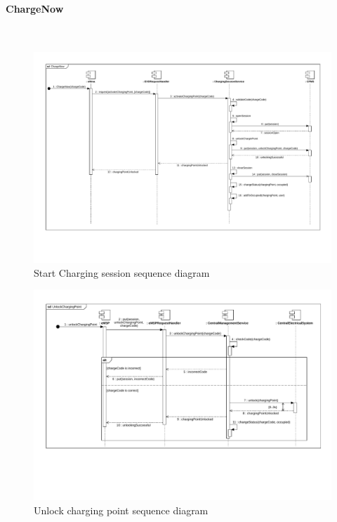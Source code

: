 \paragraph{ChargeNow}\mbox{}\\
\begin{figure}[H]
    \centering
    \includegraphics[trim={0 6.5cm 0 1cm},clip, width=1\textwidth]{Images/cp2/runtime/ChargeNow_emsp_view.pdf}
    \caption{Start Charging session sequence diagram}
\end{figure}

\begin{figure}[H]
    \centering
    \includegraphics[trim={0 6cm 0 1cm},clip, width=1\textwidth]{Images/cp2/runtime/ChargeNow_cpms_view.pdf}
    \caption{Unlock charging point sequence diagram}
\end{figure}

